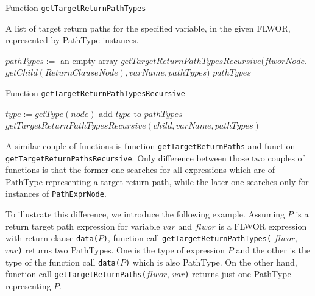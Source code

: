 \begin{algorithm}
\caption{Function \texttt{getTargetReturnPathTypes}}
\label{ALG_function_get_target_return_path_types}
\begin{algorithmic}[1]
\ENSURE A list of target return paths for the specified variable, in the given FLWOR, represented by PathType instances.

\STATE $pathTypes :=$ an empty array
\STATE $getTargetReturnPathTypesRecursive(flworNode.$ $getChild(ReturnClauseNode), varName, pathTypes)$
\RETURN $pathTypes$
\end{algorithmic}
\end{algorithm}

\begin{algorithm}
\caption{Function \texttt{getTargetReturnPathTypesRecursive}}
\label{ALG_function_get_target_return_path_types_recursive}
\begin{algorithmic}[1]

	\STATE $type := getType(node)$
		\STATE add $type$ to $pathTypes$
	\ENDIF
\ENDIF
{}
	\STATE $getTargetReturnPathTypesRecursive(child, varName, pathTypes)$
\ENDFOR
\end{algorithmic}
\end{algorithm}

A similar couple of functions is function \texttt{getTargetReturnPaths} and function \texttt{getTargetReturnPathsRecursive}. Only difference between those two couples of functions is that the former one searches for all expressions which are of PathType representing a target return path, while the later one searches only for instances of \texttt{PathExprNode}.

To illustrate this difference, we introduce the following example. Assuming $P$ is a return target path expression for variable $var$ and $flwor$ is a FLWOR expression with return clause \texttt{data(}$P$\texttt{)}, function call \texttt{getTargetReturnPathTypes(} $flwor$, $var$\texttt{)} returns two PathTypes. One is the type of expression $P$ and the other is the type of the function call \texttt{data(}$P$\texttt{)} which is also PathType. On the other hand, function call \texttt{getTargetReturnPaths(}$flwor$, $var$\texttt{)} returns just one PathType representing $P$. 

